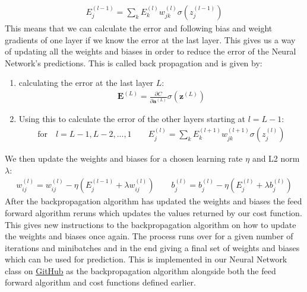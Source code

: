 \documentclass[11pt]{article}
\begin{document}
\begin{align*}
    E^{(l-1)}_j = \sum_k E^{(l)}_k w_{jk}^{(l)}\sigma(z_j^{(l-1)})
\end{align*}
This means that we can calculate the error and following bias and weight gradients of one layer if we know the error at the last layer. This gives us a way of updating all the weights and biases in order to reduce the error of the Neural Network's predictions. This is called back propagation and is given by:
\begin{enumerate}
    \item calculating the error at the last layer $L$:
          \begin{align*}
              \boldsymbol{E}^{(L)} = \frac{\partial C }{\partial \boldsymbol{a}^{(L)}} \sigma(\boldsymbol{z}^{(L)})
          \end{align*}
    \item Using this to calculate the error of the other layers starting at $l=L-1$:
          \begin{align*}
              \text{for}\quad  l=L-1, L-2,...,1 \quad\quad
              E_j^{(l)} = \sum_k E^{(l+1)}_k w_{jk}^{(l+1)} \sigma(z_j^{(l)})
          \end{align*}
\end{enumerate}
We then update the weights and biases for a chosen learning rate $\eta$ and L2 norm $\lambda$:
\begin{align*}
    w^{(l)}_{ij} = w^{(l)}_{ij} - \eta(E_j^{(l-1)}  + \lambda w_{ij}^{(l)}) \quad\quad b_j^{(l)} = b_j^{(l)} - \eta(E_j^{(l)} + \lambda b_j^{(l)})
\end{align*}
After the backpropagation algorithm has updated the weights and biases the feed forward algorithm reruns which updates the values returned by our cost function. This gives new instructions to the backpropagation algorithm on how to update the weights and biases once again. The process runs over for a given number of iterations and minibatches and in the end giving a final set of weights and biases which can be used for prediction. This is implemented in our Neural Network class on \href{https://github.com/Fslippe/FYS-STK4155/tree/main/project2}{GitHub} as the backpropagation algorithm alongside both the feed forward algorithm and cost functions defined earlier.
\end{document}
